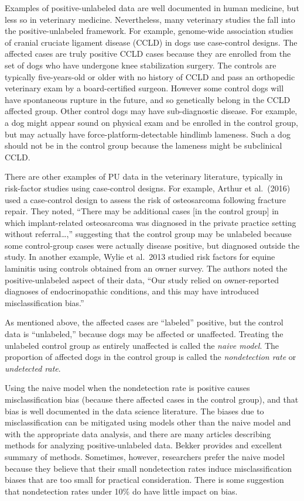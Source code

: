 \documentclass[
]{article}
\begin{document}
Examples of positive-unlabeled data are well documented in human
medicine, but less so in veterinary medicine. Nevertheless, many
veterinary studies the fall into the positive-unlabeled framework. For
example, genome-wide association studies of cranial cruciate ligament
disease (CCLD) in dogs use case-control designs. The affected cases are
truly positive CCLD cases because they are enrolled from the set of dogs
who have undergone knee stabilization surgery. The controls are
typically five-years-old or older with no history of CCLD and pass an
orthopedic veterinary exam by a board-certified surgeon. However some
control dogs will have spontaneous rupture in the future, and so
genetically belong in the CCLD affected group. Other control dogs may
have sub-diagnostic disease. For example, a dog might appear sound on
physical exam and be enrolled in the control group, but may actually
have force-platform-detectable hindlimb lameness. Such a dog should not
be in the control group because the lameness might be subclinical CCLD.
\cite{wrehim08}

There are other examples of PU data in the veterinary literature,
typically in risk-factor studies using case-control designs. For
example, Arthur et al.~(2016) used a case-control design to assess the
risk of osteosarcoma following fracture repair. \cite{aakj16} They
noted, ``There may be additional cases {[}in the control group{]} in
which implant-related osteosarcoma was diagnosed in the private practice
setting without referral\ldots,'' suggesting that the control group may
be unlabeled because some control-group cases were actually disease
positive, but diagnosed outside the study. In another example, Wylie et
al.~2013 studied risk factors for equine laminitis using controls
obtained from an owner survey.\cite{wcvj13} The authors noted the
positive-unlabeled aspect of their data, ``Our study relied on
owner-reported diagnoses of endocrinopathic conditions, and this may
have introduced misclassification bias.''

As mentioned above, the affected cases are ``labeled'' positive, but the
control data is ``unlabeled,'' because dogs may be affected or
unaffected. Treating the unlabeled control group as entirely unaffected
is called the \emph{naive model}. The proportion of affected dogs in the
control group is called the \emph{nondetection rate} or \emph{undetected
rate}.

Using the naive model when the nondetection rate is positive causes
misclassification bias (because there affected cases in the control
group), and that bias is well documented in the data science literature.
\cite{bd20} The biases due to misclassification can be mitigated using
models other than the naive model and with the appropriate data
analysis, and there are many articles describing methods for analyzing
positive-unlabeled data. Bekker provides and excellent summary of
methods. Sometimes, however, researchers prefer the naive model because
they believe that their small nondetection rates induce
misclassification biases that are too small for practical consideration.
There is some suggestion that nondetection rates under 10\% do have
little impact on bias. \cite{bd20}
\end{document}
